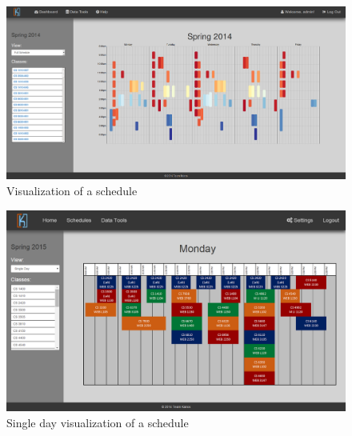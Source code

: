 \documentclass{extarticle}
\begin{document}
\begin{appendices}
\begin{figure}[!ht]
    \centering
    \includegraphics[width=1.0\textwidth]{img/full-sched-view}
    \caption{Visualization of a schedule}
    \label{fig:full-sched-view}
\end{figure}

\begin{figure}[!ht]
    \centering
    \includegraphics[width=1.0\textwidth]{img/single-day-view}
    \caption{Single day visualization of a schedule}
    \label{fig:single-day-view}
\end{figure}

\end{appendices}
\end{document}
